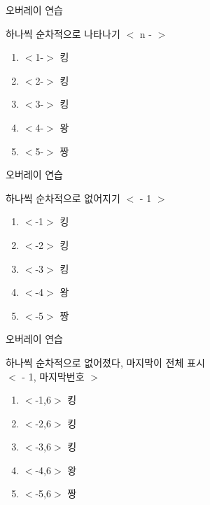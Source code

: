 \documentclass[ aspectratio=169,  10pt,blue,xcolor=pdftex,dvipsnames,table,handout,notes]{beamer}
\begin{document}
		\begin{frame}[t]{오버레이 연습}

			\begin{block} {하나씩 순차적으로 나타나기 $<$ n - $>$ }
			\begin{enumerate}
			\item <1-> $<$1-$>$ 킹
			\item <2-> $<$2-$>$ 킹
			\item <3-> $<$3-$>$ 킹
			\item <4-> $<$4-$>$ 왕
			\item <5-> $<$5-$>$ 짱
			\end{enumerate}
			\end{block}

		\end{frame}


		\begin{frame}[t]{오버레이 연습}

			\begin{block} {하나씩 순차적으로 없어지기 $<$ - 1 $>$}
			\begin{enumerate}
			\item <-1> $<$-1$>$ 킹
			\item <-2> $<$-2$>$ 킹
			\item <-3> $<$-3$>$ 킹
			\item <-4> $<$-4$>$ 왕
			\item <-5> $<$-5$>$ 짱
			\end{enumerate}
			\end{block}

		\end{frame}

		\begin{frame}[t]{오버레이 연습}

			\begin{block} {하나씩 순차적으로 없어졌다, 마지막이 전체 표시\\
						 $<$ - 1, 마지막번호 $>$}
			\begin{enumerate}
			\item <-1,6> $<$-1,6$>$ 킹
			\item <-2,6> $<$-2,6$>$ 킹
			\item <-3,6> $<$-3,6$>$ 킹
			\item <-4,6> $<$-4,6$>$ 왕
			\item <-5,6> $<$-5,6$>$ 짱
			\end{enumerate}
			\end{block}

		\end{frame}
\end{document}
